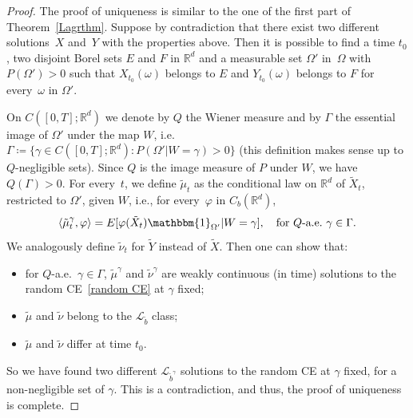 \documentclass[a4paper,10pt]{article}
\newcommand\1{\mathbbm{1}}
\newcommand{\mc}{\mathcal}
\newcommand{\lan}{\langle}
\newcommand{\ran}{\rangle}
\newcommand{\td}{\tilde}
\numberwithin{equation}{section}
\begin{document}
\begin{proof}
The proof of uniqueness is similar to the one of the first part of Theorem~\ref{Lagrthm}. Suppose by contradiction that there exist two different solutions~$X$ and~$Y$ with the properties above. Then it is possible to find a time $t_0$, two disjoint Borel sets $E$ and $F$ in $\mathbb{R}^d$ and a measurable set $\Omega'$ in~$\Omega$ with $P(\Omega')>0$ such that $X_{t_0}(\omega)$ belongs to $E$ and $Y_{t_0}(\omega)$ belongs to $F$ for every~$\omega$ in $\Omega'$.

On $C([0,T];\mathbb{R}^d)$ we denote by $Q$ the Wiener measure and by $\Gamma$ the essential image of $\Omega'$ under the map $W$, i.e.\ $\Gamma \coloneqq \{\gamma \in C([0,T];\mathbb{R}^d) \colon P(\Omega' | W=\gamma)>0\}$ (this definition makes sense up to $Q$-negligible sets). Since $Q$ is the image measure of $P$ under $W$, we have $Q(\Gamma)>0$. For every~$t$, we define $\td{\mu}_t$ as the conditional law on $\mathbb{R}^d$ of $\td{X}_t$, restricted to $\Omega'$, given $W$, i.e., for every~$\varphi$ in $C_b(\mathbb{R}^d)$,
\begin{equation*}
\lan\td{\mu}_t^{\gamma},\varphi\ran= E[\varphi(\td{X}_t) \1_{\Omega'} | W=\gamma] ,\quad \mbox{for $Q$-a.e.~}\gamma\in\Gamma.
\end{equation*}
We analogously define $\td{\nu}_t$ for $\td{Y}$ instead of $\td{X}$. Then one can show that:
\begin{itemize}
\item for $Q$-a.e.~$\gamma \in \Gamma$, $\td{\mu}^{\gamma}$ and $\td{\nu}^{\gamma}$ are weakly continuous (in time) solutions to the random CE~\eqref{random CE} at $\gamma$ fixed;
\item $\td{\mu}$ and $\td{\nu}$ belong to the $\mc{L}_{\td{b}}$ class;
\item $\td{\mu}$ and $\td{\nu}$ differ at time $t_0$.
\end{itemize}
So we have found two different $\mc{L}_{\td{b}^{\gamma}}$ solutions to the random CE at $\gamma$ fixed, for a non-negligible set of $\gamma$. This is a contradiction, and thus, the proof of uniqueness is complete.


\end{proof}
\end{document}
